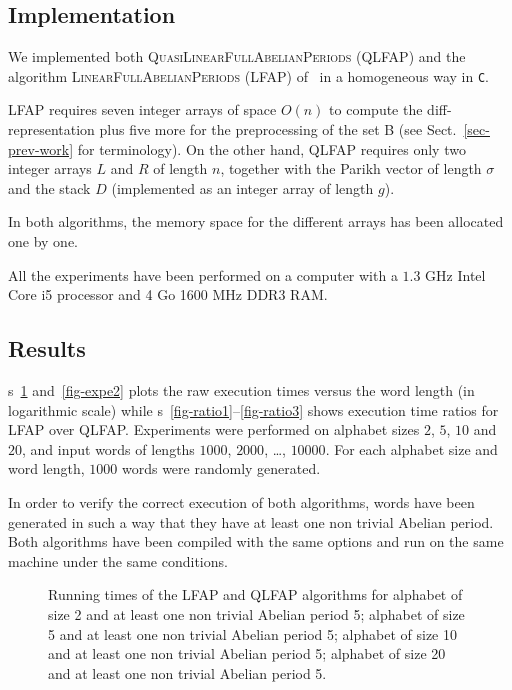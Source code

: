 \documentclass[3p]{elsarticle}
\begin{document}
\subsection{Implementation}

We implemented both \textsc{QuasiLinearFullAbelianPeriods} (QLFAP)
and the algorithm \textsc{LinearFullAbelianPeriods} (LFAP) of~\cite{KoRaRy13}
in a homogeneous way in \texttt{C}.

LFAP requires seven integer arrays of space $O(n)$ to compute
the diff-representation plus five more for the preprocessing of the set B
(see Sect.~\ref{sec-prev-work} for terminology).
On the other hand, QLFAP requires only
two integer arrays $L$ and $R$ of length $n$,
together with the Parikh vector of length $\sigma$
and the stack $D$ (implemented as an integer array of length $g$).

In both algorithms, the memory space for the different arrays has been
 allocated one by one.

All the experiments have been performed on a computer with a $1.3$ GHz Intel Core i5 processor and 4 Go 1600 MHz DDR3 RAM.

\subsection{Results}

\figurename s~\ref{fig-expe1} and~\ref{fig-expe2} plots the raw execution times 
 versus the word length (in logarithmic scale)
while 
\figurename s~\ref{fig-ratio1}--\ref{fig-ratio3} shows execution time ratios
for LFAP over QLFAP.
Experiments were performed on alphabet sizes $2$, $5$, $10$ and $20$, and input words of lengths $1000$, $2000$, \ldots, $10000$. 
For each alphabet size and word length, $1000$ words were randomly generated.

In order to verify the correct execution of both algorithms, words have been generated in such a way that they have at least one non trivial Abelian period. Both algorithms have been compiled with the same options and run on the same machine under the same conditions.

\begin{figure}

  \hspace{.3cm}

  \hspace{.3cm}
\caption{
\label{fig-expe1}
Running times of the LFAP and QLFAP algorithms for
 \protect{} alphabet of size 2 and at least one non trivial Abelian period 5; 
 \protect{} alphabet of size 5 and at least one non trivial Abelian period 5; 
 \protect{} alphabet of size 10 and at least one non trivial Abelian period 5; 
 \protect{} alphabet of size 20 and at least one non trivial Abelian period 5.
}
\end{figure}
\end{document}
